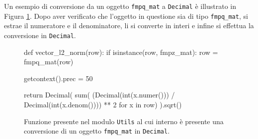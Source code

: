 Un esempio di conversione da un oggetto \texttt{fmpq\_mat} a \texttt{Decimal} è illustrato 
in Figura \ref{fig:conversione}. Dopo aver verificato che l'oggetto in questione sia di tipo  
\texttt{fmpq\_mat}, 
si estrae il numeratore e il denominatore, li si converte in interi e infine si effettua 
la conversione in \texttt{Decimal}. 

\begin{figure}[H]
    \begin{python}
        def vector_l2_norm(row):
            if isinstance(row, fmpz_mat):
                row = fmpq_mat(row)

            getcontext().prec = 50
            
            return Decimal(
                sum(
                    (Decimal(int(x.numer())) / 
                    Decimal(int(x.denom()))) ** 2 
                    for x in row)
                ).sqrt()
    \end{python}
    \caption{Funzione presente nel modulo \texttt{Utils} al cui interno è presente una 
    conversione di un oggetto \texttt{fmpq\_mat} in \texttt{Decimal}.}
    \label{fig:conversione}
\end{figure}